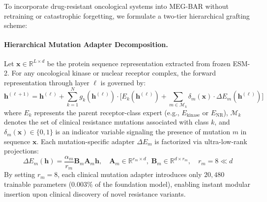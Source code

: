 \documentclass{article}
\theoremstyle{definition}
\begin{document}
To incorporate drug-resistant oncological systems into MEG-BAR without retraining or catastrophic forgetting, we formulate a two-tier hierarchical grafting scheme:

\paragraph{Hierarchical Mutation Adapter Decomposition.}
Let $\mathbf{x} \in \mathbb{R}^{L \times d}$ be the protein sequence representation extracted from frozen ESM-2. For any oncological kinase or nuclear receptor complex, the forward representation through layer $\ell$ is governed by:
\begin{equation}
\mathbf{h}^{(\ell+1)} = \mathbf{h}^{(\ell)} + \sum_{k=1}^N g_k(\mathbf{h}^{(\ell)}) \cdot \Big[ E_k(\mathbf{h}^{(\ell)}) + \sum_{m \in \mathcal{M}_k} \delta_{m}(\mathbf{x}) \cdot \Delta E_m(\mathbf{h}^{(\ell)}) \Big]
\label{eq:hierarchical_mutation_adapter}
\end{equation}
where $E_k$ represents the parent receptor-class expert (e.g., $E_{\text{kinase}}$ or $E_{\text{NR}}$), $\mathcal{M}_k$ denotes the set of clinical resistance mutations associated with class $k$, and $\delta_m(\mathbf{x}) \in \{0, 1\}$ is an indicator variable signaling the presence of mutation $m$ in sequence $\mathbf{x}$. Each mutation-specific adapter $\Delta E_m$ is factorized via ultra-low-rank projections:
\begin{equation}
\Delta E_m(\mathbf{h}) = \frac{\alpha_m}{r_m} \mathbf{B}_m \mathbf{A}_m \mathbf{h}, \quad \mathbf{A}_m \in \mathbb{R}^{r_m \times d}, \; \mathbf{B}_m \in \mathbb{R}^{d \times r_m}, \quad r_m = 8 \ll d
\label{eq:mutation_lora}
\end{equation}
By setting $r_m = 8$, each clinical mutation adapter introduces only $20,480$ trainable parameters ($0.003\%$ of the foundation model), enabling instant modular insertion upon clinical discovery of novel resistance variants.
\end{document}
